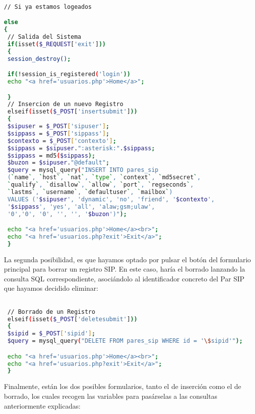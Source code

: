 \begin{lstlisting}[language=bash,title={./www/usuarios.php}]

// Si ya estamos logeados

else
{
 // Salida del Sistema
 if(isset($_REQUEST['exit']))
 {
 session_destroy();

 if(!session_is_registered('login'))
 echo "<a href='usuarios.php'>Home</a>";

 }
 // Insercion de un nuevo Registro
 elseif(isset($_POST['insertsubmit']))
 {
 $sipuser = $_POST['sipuser'];
 $sippass = $_POST['sippass'];
 $contexto = $_POST['contexto'];
 $sippass = $sipuser.":asterisk:".$sippass;
 $sippass = md5($sippass);
 $buzon = $sipuser."@default";
 $query = mysql_query("INSERT INTO pares_sip 
 (`name`, `host`, `nat`, `type`, `context`, `md5secret`, 
 `qualify`, `disallow`, `allow`, `port`, `regseconds`, 
 `lastms`, `username`, `defaultuser`, `mailbox`)
 VALUES ('$sipuser', 'dynamic', 'no', 'friend', '$contexto', 
 '$sippass', 'yes', 'all', 'alaw;gsm;ulaw',
 '0','0', '0', '', '', '$buzon')");

 echo "<a href='usuarios.php'>Home</a><br>";
 echo "<a href='usuarios.php?exit'>Exit</a>";
 }

\end{lstlisting}

La segunda posibilidad, es que hayamos optado por pulsar el botón del formulario principal para borrar un registro SIP. En este caso, haría el borrado lanzando la consulta SQL correspondiente, asociándolo al identificador concreto del Par SIP que hayamos decidido eliminar:

\begin{lstlisting}[language=bash,title={./www/usuarios.php}]

 // Borrado de un Registro
 elseif(isset($_POST['deletesubmit']))
 {
 $sipid = $_POST['sipid'];
 $query = mysql_query("DELETE FROM pares_sip WHERE id = '\$sipid'");

 echo "<a href='usuarios.php'>Home</a><br>";
 echo "<a href='usuarios.php?exit'>Exit</a>";
 }

\end{lstlisting}

Finalmente, están los dos posibles formularios, tanto el de inserción como el de borrado, los cuales recogen las variables para pasárselas a las consultas anteriormente explicadas:

